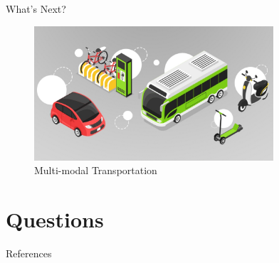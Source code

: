 \documentclass[10pt, aspectratio=169]{beamer}
\begin{document}
\begin{frame}{What's Next?}
    \begin{figure}
        \centering
        \includegraphics[height=5cm, keepaspectratio]{images/multimodaltransport.jpg}
        \caption{Multi-modal Transportation \cite{multimodal}}
    \end{figure}
\end{frame}

\section{Questions}

\begin{frame}[allowframebreaks]{References}
    
    
\end{frame}
\end{document}
